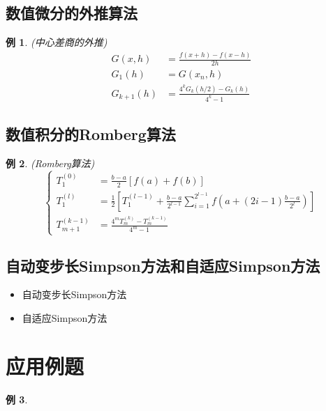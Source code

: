 \documentclass[twoside]{article}
\newtheorem{eg}{例}[section]
\begin{document}
\subsection{数值微分的外推算法}
\begin{eg}
  (中心差商的外推)
  \begin{equation}
    \begin{aligned}
      G(x,h) &= \frac{f(x+h)-f(x-h)}{2h} \\
      G_1(h)&=G(x_n,h) \\
      G_{k+1}(h)&=\frac{4^k G_k(h/2)-G_k(h)}{4^k -1}
    \end{aligned}
  \end{equation}
\end{eg}
\subsection{数值积分的Romberg算法}
\begin{eg}
  (Romberg算法)
  \begin{equation}
    \begin{cases}{}
      T^{(0)}_1 &= \frac{b-a}{2}[f(a)+f(b)] \\
      T^{(l)}_1 &= \frac{1}{2} [T^{(l-1)}_1 + \frac{b-a}{2^{l-1}} \sum^{2^{l-1}}_{i=1} f(a+(2i-1)\frac{b-a}{2^l})] \\
      T^{(k-1)}_{m+1} &= \frac{4^m T^{(k)}_m - T^{(k-1)}_m}{4^m-1}
    \end{cases}
  \end{equation}

\end{eg}
\subsection{自动变步长Simpson方法和自适应Simpson方法}
\begin{itemize}
  \item 自动变步长Simpson方法
  \item 自适应Simpson方法
\end{itemize}


\section{应用例题}
\begin{eg}
\end{eg}
\end{document}
